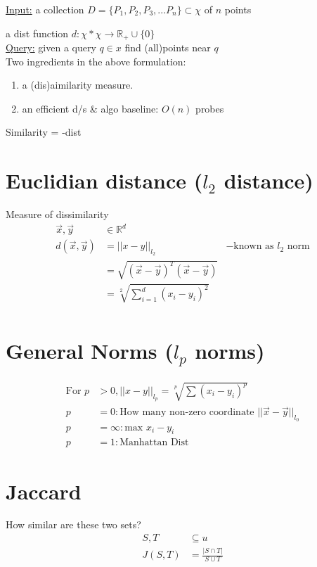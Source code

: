 \documentclass[12pt]{article}
\newcommand{\forceindent}{\leavevmode{\parindent=1.3em\indent}}
\newcommand{\dbt}{\forceindent \forceindent}
\begin{document}
\MakeScribeTop

\underline{Input:} a collection $D=\{P_1,P_2, P_3,...P_n\} \subset \chi$ of $n$ points

\dbt a dist function $d: \chi * \chi \to \mathbb{R}_+ \cup \{0\}$\\

\underline{Query:} given a query $q \in x$ find (all)points near $q$\\

Two ingredients in the above formulation:
\begin{enumerate}
	\item a (dis)aimilarity measure.
	\item an efficient d/s \& algo baseline: $O(n)$ probes
\end{enumerate}
Similarity = -dist

\section{Euclidian distance ($l_2$ distance)}

Measure of dissimilarity
\begin{align*}
	\vec{x},\vec{y} &\in \mathbb{R}^d\\
	d(\vec{x}, \vec{y}) &= ||x-y||_{l_2} &-\text{known as $l_2$ norm}\\
	&=\sqrt{(\vec{x}-\vec{y})^T (\vec{x}-\vec{y})}\\
	&=\sqrt[2]{\sum_{i=1}^{d}(x_i-y_i)^2}\\
\end{align*}
\section{General Norms ($l_p$ norms)}
\begin{align*}
\text{For } p&>0, ||x-y||_{l_p} = \sqrt[p]{\sum(x_i-y_i)^p}\\
p&=0 : \text{How many non-zero coordinate $||\vec{x}-\vec{y}||_{l_0}$}\\
p&= \infty : \text{max $x_i - y_i$}\\
p&=1 : \text{Manhattan Dist}
\end{align*}
\section{Jaccard}
How similar are these two sets?
\begin{align*}
	S,T &\subseteq u\\
	J(S, T) &= \frac{|S \cap T|}{S \cup T}
\end{align*}
\end{document}
